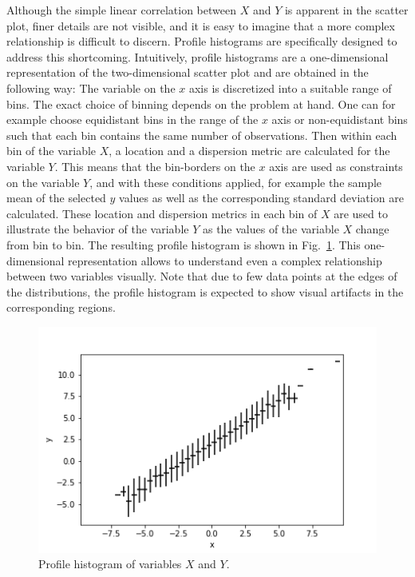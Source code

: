 \documentclass[BCOR=1mm, DIV=calc,10pt,
twoside=true,
twocolumn,
headings=normal]{scrartcl}
\newcommand{\fig}{Fig.~}
\begin{document}
Although the simple linear correlation between $X$ and $Y$ is apparent in the scatter plot, finer details are not visible, and it is easy to imagine that a more complex relationship is difficult to discern. Profile histograms are specifically designed to address this shortcoming. Intuitively, profile histograms are a one-dimensional representation of the two-dimensional scatter plot and are obtained  in the following way: The variable on the $x$ axis is discretized into a suitable range of bins. The exact choice of binning depends on the problem at hand. One can for example choose equidistant bins in the range of the $x$ axis or non-equidistant bins such that each bin contains the same number of observations. Then within each bin of the variable $X$, a location and a dispersion metric are calculated for the variable $Y$. This means that the bin-borders on the $x$ axis are used as constraints on the variable $Y$, and with these conditions applied, for example the sample mean of the selected $y$ values as well as the corresponding standard deviation are calculated. These location and dispersion metrics in each bin of $X$ are used to illustrate the behavior of the variable $Y$ as the values of the variable $X$ change from bin to bin. The resulting profile histogram is shown in \fig \ref{fig:profile}. This one-dimensional representation allows to understand even a complex relationship between two variables visually. Note that due to few data points at the edges of the distributions, the profile histogram is expected to show visual artifacts in the corresponding regions.

\begin{figure}
\begin{center}
\includegraphics[scale=0.5]{figs/profile}
\caption{\label{fig:profile} Profile histogram of variables $X$ and $Y$.}
\end{center}
\end{figure}
\end{document}
